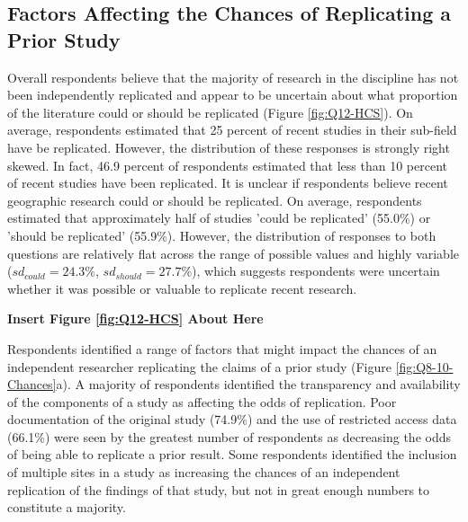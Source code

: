 \documentclass[]{interact}
\theoremstyle{plain}%
\theoremstyle{definition}
\theoremstyle{remark}
\begin{document}
\subsection*{Factors Affecting the Chances of Replicating a Prior Study}
Overall respondents believe that the majority of research in the discipline has not been independently replicated and appear to be uncertain about what proportion of the literature could or should be replicated (Figure \ref{fig:Q12-HCS}). 
On average, respondents estimated that 25 percent of recent studies in their sub-field have be replicated. 
However, the distribution of these responses is strongly right skewed.
In fact, 46.9 percent of respondents estimated that less than 10 percent of recent studies have been replicated.
It is unclear if respondents believe recent geographic research could or should be replicated.
On average, respondents estimated that approximately half of studies 'could be replicated' (55.0\%) or 'should be replicated' (55.9\%). However, the distribution of responses to both questions are relatively flat across the range of possible values and highly variable (\textit{$sd_{could}=24.3\%$}, \textit{$sd_{should}=27.7\%$}), which suggests 
respondents were uncertain whether it was possible or valuable to replicate recent research.  

\begin{center}
\textbf{Insert Figure \ref{fig:Q12-HCS} About Here}
\end{center}

Respondents identified a range of factors that might impact the chances of an independent researcher replicating the claims of a prior study (Figure \ref{fig:Q8-10-Chances}a).
A majority of respondents identified the transparency and availability of the components of a study as affecting the odds of replication. 
Poor documentation of the original study (74.9\%) and the use of restricted access data (66.1\%) were seen by the greatest number of respondents as decreasing the odds of being able to replicate a prior result. 
Some respondents identified the inclusion of multiple sites in a study as increasing the chances of an independent replication of the findings of that study, but not in great enough numbers to constitute a majority. 
\end{document}
